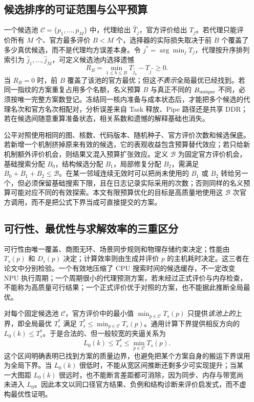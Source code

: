 \subsection{候选排序的可证范围与公平预算}
一个候选池 $\mathcal C=\{p_1,\ldots,p_M\}$ 中，代理给出 $\widehat T_j$，官方评价给出 $T_j$。若代理只能评价所有 $M$ 个、官方最多评价 $B<M$ 个，选择器的实际损失取决于前 $B$ 个覆盖了多少真优候选，而不是代理均方误差本身。令 $j^*=\arg\min_j T_j$，代理按升序排列索引为 $\widehat j_1,\ldots,\widehat j_M$，可定义候选池内选择遗憾
\begin{equation}\label{eq:selection-regret}
R_B=\min_{1\le b\le B}T_{\widehat j_b}-T_{j^*}\ge0.
\end{equation}
当 $R_B=0$ 时，前 $B$ 覆盖了该池的官方最优；但这\emph{不表示}全局最优已经找到。若同一指纹的方案重复占用多个名额，名义预算 $B$ 与真正不同的 $B_{\rm unique}$ 不同，必须按唯一完整方案数登记。冻结同一核内准备与成本状态后，才能把多个候选的代理名次和官方名次相配对，分析误差来自 Task 释放、Pipe 路径还是共享 DDR；若在候选间随意重算准备状态，相关系数和遗憾的解释基础也消失。

公平对照使用相同的图、核数、代码版本、随机种子、官方评价次数和候选保底。若新增一个机制挤掉原来有效的候选，它的表观收益包含预算替代效应；若只给新机制额外评价机会，则结果又混入预算扩张效应。定义 $\mathcal B$ 为固定官方评价机会，基础搜索分配 $B_0$，结构候选分配 $B_1$，局部修复分配 $B_2$，需满足 $B_0+B_1+B_2\le\mathcal B$。在某一邻域连续无效时可以把尚未使用的 $B_1$ 或 $B_2$ 转给另一个，但必须保留基础搜索下限，且在日志记录实际采用的次数；否则同样的名义预算可能对应不同的有效探索。本文有限预算优化的目标是高质量地使用这 $\mathcal B$ 次官方调用，而不是把公式下界当成可直接提交的方案。

\subsection{可行性、最优性与求解效率的三重区分}
可行性由唯一覆盖、商图无环、场景同步规则和物理存储约束决定；性能由 $T_s(p)$ 和 $D_s(p)$ 决定；计算效率则由生成并评价 $p$ 的主机耗时决定。这三者在论文中分别检验。一个有效地压缩了 CPU 搜索时间的候选缓存，不一定改变 NPU 执行周期；一个周期很小的代理预测方案，若未经过正式评价与内存检查，不能称为高质量可行结果；一个正式评价优于对照的方案，也不能据此推断全局最优。

对每个固定候选池 $\mathcal C$，官方评价中的最小值 $\min_{p\in\mathcal C}T_s(p)$ 只提供\emph{该池上的}上界，即全局最优 $T_s^*$ 满足 $T_s^*\le\min_{p\in\mathcal C}T_s(p)$。通用计算下界提供相反方向的 $L_0(k)\le T_s^*$。于是合法的、但一般较宽的夹逼关系为
\begin{equation}\label{eq:global-bound-sandwich}
L_0(k)\le T_s^*\le\min_{p\in\mathcal C}T_s(p).
\end{equation}
这个区间明确表明已找到方案的质量边界，也避免把某个方案自身的搬运下界误用为全局下界。当 $L_0(k)$ 很低时，不能从宽区间推断还剩多少可实现提升；当某一大图距 $L_0(k)$ 很远时，也不能断言差距都可消除，因为同步、内存与带宽尚未进入 $L_0$。因此本文以同口径官方结果、负例和结构诊断来评价启发式，而不虚构最优性证明。
